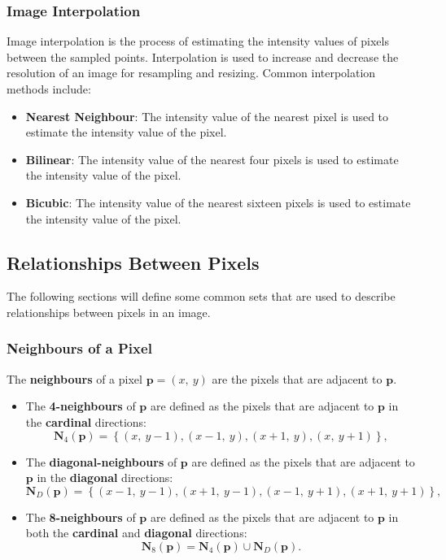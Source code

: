 \documentclass{article}
\begin{document}
\subsubsection{Image Interpolation}
Image interpolation is the process of estimating the intensity values
of pixels between the sampled points. Interpolation is used to increase
and decrease the resolution of an image for resampling and resizing.
Common interpolation methods include:
\begin{itemize}
    \item \textbf{Nearest Neighbour}: The intensity value of the nearest
          pixel is used to estimate the intensity value of the pixel.
    \item \textbf{Bilinear}: The intensity value of the nearest four
          pixels is used to estimate the intensity value of the pixel.
    \item \textbf{Bicubic}: The intensity value of the nearest sixteen
          pixels is used to estimate the intensity value of the pixel.
\end{itemize}
\subsection{Relationships Between Pixels}
The following sections will define some common sets that are used to
describe relationships between pixels in an image.
\subsubsection{Neighbours of a Pixel}
The \textbf{neighbours} of a pixel \(\symbf{p} = \left( x,\: y
\right)\) are the pixels that are adjacent to \(\symbf{p}\).
\begin{itemize}
    \item The \textbf{4-neighbours} of \(\symbf{p}\) are defined as the
          pixels that are adjacent to \(\symbf{p}\) in the
          \textbf{cardinal} directions:
          \begin{equation*}
              \symbf{N}_4\left( \symbf{p} \right) = \left\{ \left( x,\: y-1 \right), \left( x-1,\: y \right), \left( x+1,\: y \right), \left( x,\: y+1 \right) \right\},
          \end{equation*}
    \item The \textbf{diagonal-neighbours} of \(\symbf{p}\) are defined
          as the pixels that are adjacent to \(\symbf{p}\) in the
          \textbf{diagonal} directions:
          \begin{equation*}
              \symbf{N}_D\left( \symbf{p} \right) = \left\{ \left( x-1,\: y-1 \right), \left( x+1,\: y-1 \right), \left( x-1,\: y+1 \right), \left( x+1,\: y+1 \right) \right\},
          \end{equation*}
    \item The \textbf{8-neighbours} of \(\symbf{p}\) are defined as the
          pixels that are adjacent to \(\symbf{p}\) in both the
          \textbf{cardinal} and \textbf{diagonal} directions:
          \begin{equation*}
              \symbf{N}_8\left( \symbf{p} \right) = \symbf{N}_4\left( \symbf{p} \right) \cup \symbf{N}_D\left( \symbf{p} \right).
          \end{equation*}
\end{itemize}
\end{document}
